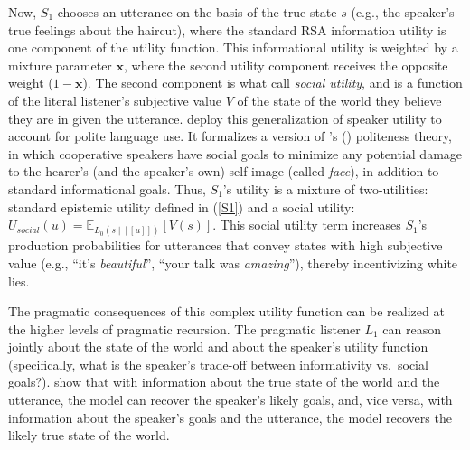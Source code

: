 \documentclass{sp}
\newcommand{\mf}[1]{\textcolor{orange}{[mf: #1]}}
\newcommand{\mht}[1]{\textcolor{purple}{[mht: #1]}}
\newcommand{\sem}[1]{\ensuremath{[\![#1]\!]}}
\begin{document}
Now, $S_1$ chooses an utterance on the basis of the true state $s$ (e.g., the speaker's true feelings about the haircut), where the standard RSA information utility is one component of the utility function. 
This informational utility is weighted by a mixture parameter $\textbf{x}$, where the second utility component receives the opposite weight ($1-\textbf{x}$).
The second component is what \cite{yoonetal2016} call \emph{social utility}, and is a function of the literal listener's subjective value $V$ of the state of the world they believe they are in given the utterance.
\cite{yoonetal2016} deploy this generalization of speaker utility to account for polite language use. 
It formalizes a version of \citeauthor{brown1987politeness}'s (\citeyear{brown1987politeness}) politeness theory, in which cooperative speakers have social goals to minimize any potential damage to the hearer’s (and the speaker’s own) self-image (called \emph{face}), in addition to standard informational goals.
Thus, $S_1$'s utility is a mixture of two-utilities: standard epistemic utility defined in (\ref{S1}) and a social utility: $U_{social}(u)  =  \mathbb{E}_{L_0(s \mid \sem{u})}[V(s)]$.
%
This social utility term increases $S_1$'s production probabilities for utterances that convey states with high subjective value (e.g., ``it's \emph{beautiful}'', ``your talk was \emph{amazing}''), thereby incentivizing white lies. 

The pragmatic consequences of this complex utility function can be realized at the higher levels of pragmatic recursion.
The pragmatic listener $L_1$ can reason jointly about the state of the world and about the speaker's utility function (specifically, what is the speaker's trade-off between informativity vs.~social goals?). \cite{yoonetal2016} show that with information about the true state of the world and the utterance, the model can recover the speaker's likely goals, and, vice versa, with information about the speaker's goals and the utterance, the model recovers the likely true state of the world.
\end{document}
